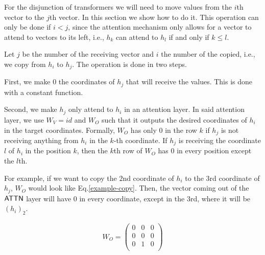 For the disjunction of transformers we will need to move values from the $i$th vector to the $j$th vector.
In this section we show how to do it.
This operation can only be done if $i < j$, since the attention mechanism only allows for a vector to attend to vectors to its left, i.e., $h_k$ can attend to $h_l$ if and only if $k \leq l$.

Let $j$ be the number of the receiving vector and $i$ the number of the copied, i.e., we copy from $h_i$ to $h_j$.
The operation is done in two steps.

First, we make $0$ the coordinates of $h_j$ that will receive the values.
This is done with a constant function.

Second, we make $h_j$ only attend to $h_i$ in an attention layer.
In said attention layer, we use $W_V = id$ and $W_O$ such that it outputs the desired coordinates of $h_i$ in the target coordinates.
Formally, $W_O$ has only $0$ in the row $k$ if $h_j$ is not receiving anything from $h_i$ in the $k$-th coordinate.
If $h_j$ is receiving the coordinate $l$ of $h_i$ in the position $k$, then the $k$th row of $W_O$ has $0$ in every position except the $l$th.

For example, if we want to copy the $2$nd coordinate of $h_i$ to the $3$rd coordinate of $h_j$, $W_O$ would look like Eq.\eqref{example-copy}.
Then, the vector coming out of the $\mathsf{ATTN}$ layer will have $0$ in every coordinate, except in the $3$rd, where it will be $(h_i)_2$.

\begin{align}\label{example-copy}
    W_O = \left(\begin{matrix}
            0 & 0 & 0 \\
            0 & 0 & 0 \\
            0 & 1 & 0 \\
        \end{matrix}\right)
\end{align}

